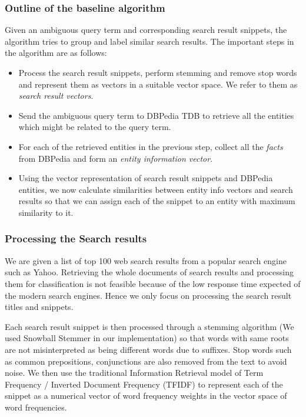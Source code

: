\documentclass[a4paper,12pt]{report}
\begin{document}
\subsubsection{Outline of the baseline algorithm}

Given an ambiguous query term and corresponding search result
snippets, the algorithm tries to group and label similar search
results. The important steps in the algorithm are as follows:

\begin{itemize}
  \item Process the search result snippets, perform stemming and
    remove stop words and represent them as vectors in a suitable
    vector space. We refer to them as {\it search result vectors}.
  \item Send the ambiguous query term to DBPedia TDB to retrieve all the
    entities which might be related to the query term.
  \item For each of the retrieved entities in the previous step,
    collect all the {\it facts} from DBPedia and form an {\it entity
      information vector}.
  \item Using the vector representation of search result snippets and
    DBPedia entities, we now calculate similarities between entity info
    vectors and search results so that we can assign each of the
    snippet to an entity with maximum similarity to it.

\end{itemize}

\subsubsection{Processing the Search results}

We are given a list of top 100 web search results from a popular
search engine such as Yahoo. Retrieving the whole documents of search
results and processing them for classification is not feasible because
of the low response time expected of the modern search engines. Hence
we only focus on processing the search result titles and snippets. 

Each search result snippet is then processed through a stemming
algorithm (We used Snowball Stemmer in our implementation) so that
words with same roots are not misinterpreted as being different words
due to suffixes. Stop words such as common prepositions, conjunctions
are also removed from the text to avoid noise. We then use the
traditional Information Retrieval model of Term Frequency / Inverted
Document Frequency (TFIDF) to represent each of the snippet as a
numerical vector of word frequency weights in the vector space of
word frequencies.
\end{document}
